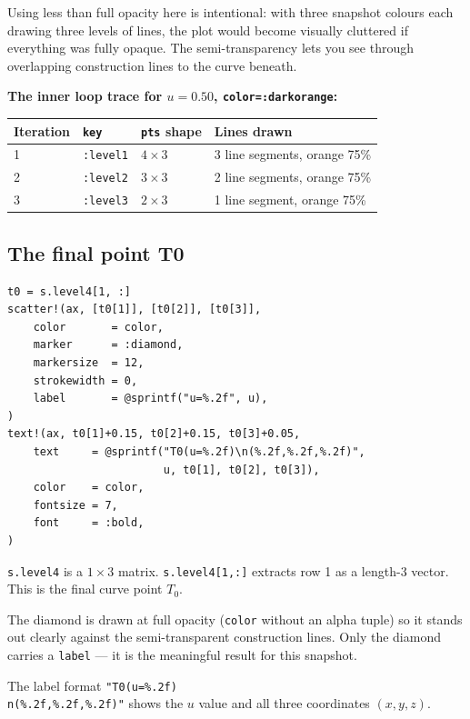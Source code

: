\documentclass[12pt, a4paper]{article}
\newcommand{\cd}[1]{\texttt{#1}}
\begin{document}
Using less than full opacity here is intentional:
with three snapshot colours each drawing three levels
of lines, the plot would become visually cluttered if
everything was fully opaque.
The semi-transparency lets you see through overlapping
construction lines to the curve beneath.

\begin{examplebox}
\textbf{The inner loop trace for $u=0.50$, \cd{color=:darkorange}:}

\medskip
\begin{tabular}{llll}
\toprule
Iteration & \cd{key} & \cd{pts} shape & Lines drawn \\
\midrule
1 & \cd{:level1} & $4\times3$ & 3 line segments, orange 75\% \\
2 & \cd{:level2} & $3\times3$ & 2 line segments, orange 75\% \\
3 & \cd{:level3} & $2\times3$ & 1 line segment, orange 75\% \\
\bottomrule
\end{tabular}
\end{examplebox}

\subsection{The final point T0}

\begin{verbatim}
t0 = s.level4[1, :]
scatter!(ax, [t0[1]], [t0[2]], [t0[3]],
    color       = color,
    marker      = :diamond,
    markersize  = 12,
    strokewidth = 0,
    label       = @sprintf("u=%.2f", u),
)
text!(ax, t0[1]+0.15, t0[2]+0.15, t0[3]+0.05,
    text     = @sprintf("T0(u=%.2f)\n(%.2f,%.2f,%.2f)",
                        u, t0[1], t0[2], t0[3]),
    color    = color,
    fontsize = 7,
    font     = :bold,
)
\end{verbatim}

\cd{s.level4} is a $1\times3$ matrix.
\cd{s.level4[1,:]} extracts row 1 as a length-3 vector.
This is the final curve point $T_0$.

The diamond is drawn at full opacity (\cd{color} without
an alpha tuple) so it stands out clearly against the
semi-transparent construction lines.
Only the diamond carries a \cd{label} --- it is the
meaningful result for this snapshot.

The label format \cd{"T0(u=\%.2f)\\n(\%.2f,\%.2f,\%.2f)"}
shows the $u$ value and all three coordinates $(x,y,z)$.
\end{document}
